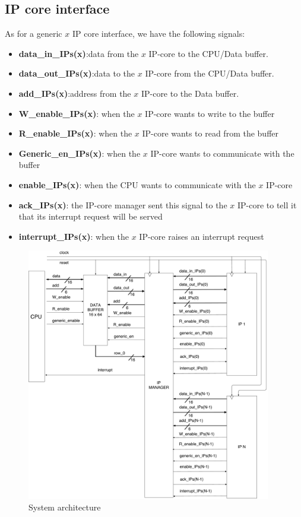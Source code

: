 \subsection{IP core interface} \label{IPinter}
	As for a generic $ x $ IP core interface, we have the following signals:
	\begin{itemize}
	\item \textbf{data\_in\_IPs(x)}:data from the $ x $ IP-core to the CPU/Data buffer.
\item \textbf{data\_out\_IPs(x)}:data to the $ x $ IP-core from the CPU/Data buffer.
\item \textbf{add\_IPs(x)}:address from the $ x $ IP-core to the Data buffer.
\item \textbf{W\_enable\_IPs(x)}: when the $ x $ IP-core wants to write to the buffer
\item \textbf{R\_enable\_IPs(x)}: when the $ x $ IP-core wants to read from the buffer
\item \textbf{Generic\_en\_IPs(x)}: when the $ x $ IP-core wants to communicate with the buffer	
\item \textbf{enable\_IPs(x)}: when the CPU wants to communicate with the $ x $ IP-core
\item \textbf{ack\_IPs(x)}: the IP-core manager sent this signal to the $ x $ IP-core to tell it that its interrupt request will be served
\item \textbf{interrupt\_IPs(x)}: when the $ x $ IP-core raises an interrupt request
\end{itemize}
	\begin{figure}[h]
		\centering
		\includegraphics[width=0.95\textwidth]{chapters/figures/Interface.pdf}  
		\caption{System architecture}
		\label{00fig}
	\end{figure}
\clearpage
\newpage
